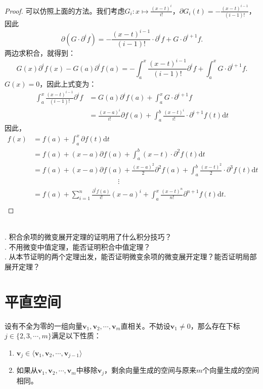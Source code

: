 \documentclass[12pt,UTF8]{ctexbook}
\begin{document}
\begin{appendix}
\begin{proof}
    可以仿照上面的方法。我们考虑$G_i: x\mapsto \frac{(x - t)^i}{i!}$，$\partial G_i(t) = -\frac{(x - t)^{i-1}}{(i-1)!}$，
    因此
    $$ \partial (G\cdot \partial^i f) = -\frac{(x - t)^{i-1}}{(i-1)!} \cdot \partial^i f + G \cdot \partial^{i+1} f. $$
    两边求积合，就得到：
    $$ G(x) \partial^i f(x) - G(a) \partial^i f(a) = - \int_a^x \frac{(x - t)^{i-1}}{(i-1)!} \partial^i f + \int_a^x G \cdot \partial^{i+1} f. $$
    $G(x) = 0$，因此上式变为：
    \begin{align*}
        \int_a^x \frac{(x - t)^{i-1}}{(i-1)!}\partial^i f & = G(a) \partial^i f(a)  + \int_a^x G \cdot \partial^{i+1} f \\
        & = \frac{(x - a)^i}{i!} \partial f(a) + \int_a^b \frac{(x - t)^i}{i!}\cdot \partial^{i+1} f(t)\mathrm{d}t
    \end{align*}
    因此，
    \begin{align*}
        f(x) &= f(a) + \int_a^x \partial f(t) \mathrm{d}t \\
        &= f(a) + (x - a) \partial f(a) + \int_a^b (x - t) \cdot \partial^2 f(t) \mathrm{d}t \\
        &= f(a) + (x - a) \partial f(a) + \frac{(x - a)^2}{2} \partial^2 f(a) + \int_a^b \frac{(x - t)^2}{2} \cdot \partial^3 f(t) \mathrm{d}t\\
        & \qquad \qquad \qquad \qquad\qquad \qquad \vdots \\
        &= f(a) + \sum_{i=1}^n \frac{\partial^i f(a)}{i!} (x - a)^i + \int_a^x \frac{(x - t)^{n}}{n!} \partial^{n+1} f(t)\mathrm{d}t. \\
    \end{align*}    
\end{proof}

\begin{sk}
    \mbox{} \\
    . 积合余项的微变展开定理的证明用了什么积分技巧？\\
    . 不用微变中值定理，能否证明积合中值定理？\\
    . 从本节证明的两个定理出发，能否证明微变余项的微变展开定理？能否证明局部展开定理？
\end{sk}

\chapter{平直空间}

\begin{tm}\label{tm:d-1-20}
    设有不全为零的一组向量$\mathbf{v}_1, \mathbf{v}_2 , \cdots , \mathbf{v}_m$直相关。不妨设$\mathbf{v}_1 \neq 0$，那么存在下标$j \in \{2,3, \cdots, m\}$满足以下性质：
    \begin{enumerate}
    \item $\mathbf{v}_j \in \langle \mathbf{v}_1, \mathbf{v}_2 , \cdots , \mathbf{v}_{j-1}\rangle$
    \item 如果从$\mathbf{v}_1, \mathbf{v}_2 , \cdots , \mathbf{v}_m$中移除$\mathbf{v}_j$，剩余向量生成的空间与原来$m$个向量生成的空间相同。
    \end{enumerate}
\end{tm}


\end{appendix}
\end{document}
